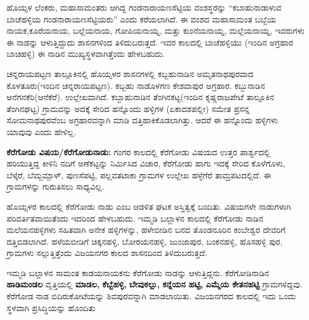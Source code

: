 ಹೊಯ್ಸಳ ಲೆಂಕರು, ಮಹಾಸಾಮಂತರು ಆಗಿದ್ದ ಗಂಡನಾರಾಯಣಸೆಟ್ಟಿಯ ವಂಶಸ್ಥರನ್ನು “ಕಬಾಹುನಾಡಾಳುವ ಬಾಚೆಹಳ್ಳಿಯ ಗಂಡನಾರಾಯಣಸೆಟ್ಟಿಯರು” ಎಂದು ಕರೆಯಲಾಗಿದೆ. ಈ ವಂಶದ ಮಹಾಸಾಮಂತ ಬಬ್ಬೆಯ ನಾಯಕ,\break ಕೂರೆಯನಾಯ, ಬಲ್ಲೆಯನಾಯ, ಗೋಪಿಯನಾಯ್ನ, ಮತ್ತು ಕುಂನೆಯನಾಯ್ನ, ಮಲ್ಲೆಯನಾಯ್ನ, ಇವರು\-ಗಳು ಈ ನಾಡನ್ನು ಆಳುತ್ತಿದ್ದುದು ಶಾಸನಗಳಿಂದ ತಿಳಿದುಬರುತ್ತದೆ. ಇವರ ಕಾಲದಲ್ಲಿ ಬಾಚೆಹಳ್ಳಿಯು (ಇಂದಿನ ಅಗ್ರಹಾರ ಬಾಚಹಳ್ಳಿ) ಈ ನಾಡಿನ ಮುಖ್ಯಸ್ಥಳವಾಗಿತ್ತೆಂದು ಹೇಳಬಹುದು.

ಚನ್ನರಾಯಪಟ್ಟಣ ತಾಲ್ಲೂಕಿನಲ್ಲಿ ಹೊಯ್ಸಳರ ಶಾಸನಗಳಲ್ಲಿ ಕಬ್ಬಹುನಾಡಿನ ಅಮೃತನಾಥಪುರವಾದ ಕೊಳತೂರು(ಇಂದಿನ ಚನ್ನರಾಯಪಟ್ಟಣ). ಕಬ್ಬಹು ನಾಡೊಳಗಣ ಕೇಶವಾಪುರ ಅಗ್ರಹಾರ. ಕಬ್ಬುನಾಡಿನ ಆನೆಗನಕೆರಿ(ಆನೆಕೆರೆ). ಉಲ್ಲೇಖ\-ವಾಗಿದೆ. ಕಬ್ಬಾಹುನಾಡಿನ ತೆಂಗಿನಕಟ್ಟ(ಇಂದಿನ ಕೃಷ್ಣರಾಜಪೇಟೆ ತಾಲ್ಲೂಕಿನ ತೆಂಗಿನಘಟ್ಟ) ಗ್ರಾಮವನ್ನು ಅದಕ್ಕೆ ಸೇರಿದ ಹನ್ನೊಂದು ಹಳ್ಳಿಗಳ (ಏಕಾದಶಪಲ್ಲೀ) ಸಮೇತ ಪ್ರಸನ್ನ ಸೋಮನಾಥಪುರವೆಂಬ ಅಗ್ರಹಾರವನ್ನಾಗಿ ಮಾಡಿ ದತ್ತಿಹಾಕಿಕೊಡ\-ಲಾಗಿತ್ತು. ಆದರೆ ಈ ಹನ್ನೊಂದು ಹಳ್ಳಿಗಳು ಯಾವುವು ಎಂದು ಹೇಳಿಲ್ಲ.

\textbf{ಕೆರೆಗೋಡು ವಿಷಯ/ಕೆರೆಗೋಡುನಾಡು:} ಗಂಗರ ಕಾಲದಲ್ಲಿ ಕೆರೆಗೋಡು ವಿಷಯದ ಉತ್ತರ ಪಾರ್ಶ್ವದಲ್ಲಿ ಹರಿಯುತ್ತಿದ್ದ ಕೀಳಿನಿ ನದಿಗೆ ಅಣೆಕಟ್ಟನ್ನು ನಿರ್ಮಿಸಿದ ವಿಚಾರ, ಕೆರೆಗೋಡು ಹಾಗು ಇದಕ್ಕೆ ಸೇರಿದ ಕೊಳೆಗೊಳು, ಬೆಳ್ಕೆರೆ, ಬೆಮ್ಬಮ್ಪಾಳ್​, ಪುಣಸೆಪಟ್ಟಿ, ಪಲ್ಲವತಟಾಕಾ ಗ್ರಾಮಗಳ ಉಲ್ಲೇಖ ಹಳ್ಳೆಗೆರೆ ತಾಮ್ರಪಟದಲ್ಲಿದೆ. ಈ ಗ್ರಾಮಗಳನ್ನು ಗುರುತಿಸಲು ಸಾಧ್ಯವಿಲ್ಲ.

ಹೊಯ್ಸಳರ ಕಾಲದಲ್ಲಿ ಕೆರೆಗೋಡು ನಾಡು ಎಂಬ ಆಡಳಿತ ಘಟಕ ಅಸ್ತಿತ್ವಕ್ಕೆ ಬಂದಿತು. ವಿಷಯಗಳೇ ನಾಡುಗಳಾಗಿ ಪರಿವರ್ತಿತವಾಯಿತೆಂದು ಇದರಿಂದ ಹೇಳಬಹುದು. ಇಮ್ಮಡಿ ಬಲ್ಲಾಳನ ಕಾಲದಲ್ಲಿ ಕೆರೆಗೋಡು ನಾಡಿನ ಮಲೆಯನಹಳ್ಳಿಗಳು ಸಹಿತವಾಗಿ ಅನೇಕ ಹಳ್ಳಿಗಳನ್ನು, ಹಳೇಬೀಡಿನ ಬನದ ತೊಂಡನೂರಿನ ಕಂಬೇಶ್ವರ ದೇವರಿಗೆ ದತ್ತಿಬಿಡಲಾಗಿದೆ. ಹಳೆಯಬೀಡಿಗೆ ಚಿಕ್ಕನಹಳ್ಳಿ, ಬೋರಯನಹಳ್ಳಿ, ಜುಂಜಾಪುರ, ಬಂಕನಹಳ್ಳಿ, ಹೊಸಹಳ್ಳಿ ಪುರ, ಗ್ರಾಮಗಳು ಸಲ್ಲುತ್ತಿತ್ತೆಂದು ವಿಜಯನಗರ ಕಾಲದ ಶಾಸನದಿಂದ ತಿಳಿದುಬರುತ್ತದೆ.

ಇಮ್ಮಡಿ ಬಲ್ಲಾಳನ ಸಾಮಂತ ಕಾಡಯನಾಯಕನು ಕೆರೆಗೋಡು ನಾಡನ್ನು ಆಳುತ್ತಿದ್ದನು. ಕೆರೆಗೋಡಿನಾಡಿನ \textbf{ಹಾಡಿಮಂಡಲ }ವೃತ್ತಿಯಲ್ಲಿ \textbf{ಮಾಡಲ,} \textbf{ಕೆಬ್ಬೆಹಳ್ಳಿ,} \textbf{ಬೇವುಕಲ್ಲು,} \textbf{ಕನ್ನೆಯನ ಹಟ್ಟಿ,} \textbf{ಎಮ್ಮೆಯ ಕೇತನಹಟ್ಟಿ} ಗ್ರಾಮಗಳಿದ್ದವು. ಕೆರೆಗೋಡ ನಾಡ ಬಿದಿರುಕೋಟೆಯನ್ನು ಶಿವಪುರವನ್ನಾಗಿ ಮಾಡಲಾಯಿತು. ವಿಜಯನಗರದ ಕಾಲದಲ್ಲಿ ಇದು ಒಂದು ಸ್ಥಳವಾಗಿ ಪ್ರಸಿದ್ಧಿಯನ್ನು ಹೊಂದಿತು

